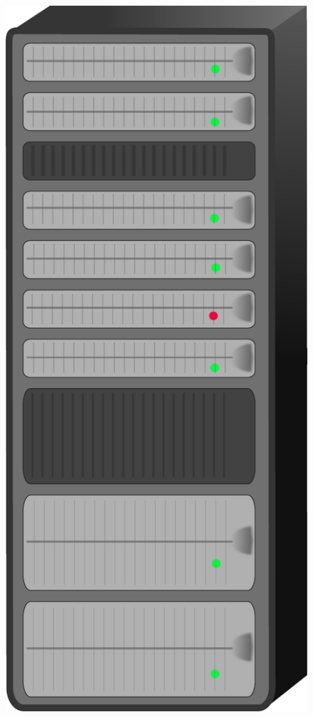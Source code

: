 \begin{frame}
\begin{columns}
\begin{figure}
      \includegraphics[scale=0.10]{images/server.pdf}

\end{figure}
\end{columns}
\end{frame}
